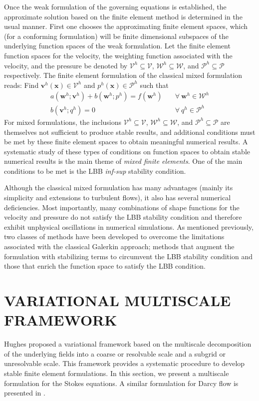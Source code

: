 \documentclass[11pt]{amsart}
\begin{document}
Once the weak formulation of the governing equations is established, the approximate 
solution based on the finite element method is determined in the usual manner. First 
one chooses the approximating finite element spaces, which (for a conforming formulation) 
will be finite dimensional subspaces of the underlying function spaces of the weak 
formulation. Let the finite element function spaces for the velocity, the weighting 
function associated with the velocity, and the pressure be denoted by $\mathcal{V}^{h} 
\subseteq \mathcal{V}$, $\mathcal{W}^h \subseteq \mathcal{W}$, and $\mathcal{P}^h 
\subseteq \mathcal{P}$ respectively. The finite element formulation of the classical 
mixed formulation reads: Find $\boldsymbol{v}^h(\boldsymbol{x}) \in \mathcal{V}^h$ and 
$p^h(\boldsymbol{x}) \in \mathcal{P}^h$ such that 
\begin{align}
  \label{Eqn:SNS_FEM_CM_Momentum}
  a(\boldsymbol{w}^h;\boldsymbol{v}^h) + 
  b(\boldsymbol{w}^h;p^h) = 
  f(\boldsymbol{w}^h) & \quad \forall \ \boldsymbol{w}^h \in \mathcal{W}^h \\
\label{Eqn:SNS_FEM_CM_Continuity}
  b(\boldsymbol{v}^h;q^h) = 0 & \quad \forall \ q^h \in \mathcal{P}^h
\end{align}
For mixed formulations, the inclusions $\mathcal{V}^h \subseteq \mathcal{V}$, $\mathcal{W}^h 
\subseteq \mathcal{W}$, and $\mathcal{P}^h \subseteq \mathcal{P}$ are 
themselves not sufficient to produce stable results, and additional 
conditions must be met by these finite element spaces to obtain 
meaningful numerical results. A systematic study of these types of 
conditions on function spaces to obtain stable numerical results 
is the main theme of \emph{mixed finite elements}. One of the main 
conditions to be met is the LBB \emph{inf-sup} stability condition. 

Although the classical mixed formulation has many advantages (mainly its simplicity and extensions to turbulent flows), it also has several numerical 
deficiencies.  Most importantly, many combinations of shape functions for the 
velocity and pressure do not satisfy the LBB 
stability condition and therefore exhibit unphysical oscillations in numerical simulations. 
As mentioned previously, two classes of methods have been developed to overcome the
limitations associated with the classical Galerkin approach; methods that augment the formulation with stabilizing terms to circumvent the LBB stability condition and those that enrich the function space to satisfy the LBB condition. \section{VARIATIONAL MULTISCALE FRAMEWORK}
Hughes \cite{Hughes2} proposed a variational framework based on the 
multiscale decomposition of the underlying fields into a coarse or resolvable scale and a subgrid or unresolvable scale. This framework provides a systematic 
procedure to develop stable finite element formulations. In this section, we 
present a multiscale formulation for the Stokes 
equations. A similar formulation for Darcy flow is presented in \cite{Nakshatrala2}.
\end{document}
